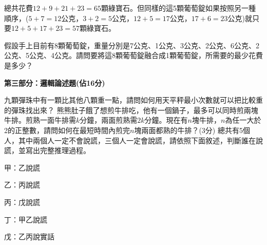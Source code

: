 \documentclass[a4paper, 12pt, addpoints]{exam}
\begin{document}
\begin{questions}
    總共花費$12+9+21+23=65$顆綠寶石。但同樣的這5顆葡萄錠如果按照另一種順序，($5+7=12$公克，$3+2=5$公克，$12+5=17$公克，$17+6=23$公克)就只要$12+5+17+23=57$顆綠寶石。

    假設手上目前有8顆葡萄錠，重量分別是7公克、1公克、3公克、2公克、6公克、2公克、5公克、4公克。請問要將這8顆葡萄錠融合成1顆葡萄錠，所需要的最少花費是多少？

\end{questions}


\newpage
\noindent \textbf{\large 第三部分：邏輯論述題(佔16分)}

\noindent {}%


\vspace{0.1in}
\begin{questions}
    \question[6]
    九顆彈珠中有一顆比其他八顆重一點，請問如何用天平秤最小次數就可以把比較重的彈珠找出來？
    \question[3]
    熊熊肚子餓了想煎牛排吃，他有一個鍋子，最多可以同時煎兩塊牛排。煎熟一面牛排需$k$分鐘，兩面煎熟需$2k$分鐘。現在有$n$塊牛排，$n$為任一大於2的正整數，請問如何在最短時間內煎完$n$塊兩面都熟的牛排？(3分)
    \question[7]
    總共有5個人，其中兩個人一定不會說謊，三個人一定會說謊，請依照下面敘述，判斷誰在說謊，並寫出完整推理過程。

    甲：乙說謊

    乙：丙說謊

    丙：戊說謊

    丁：甲乙說謊

    戊：乙丙說實話


\end{questions}
\end{document}
